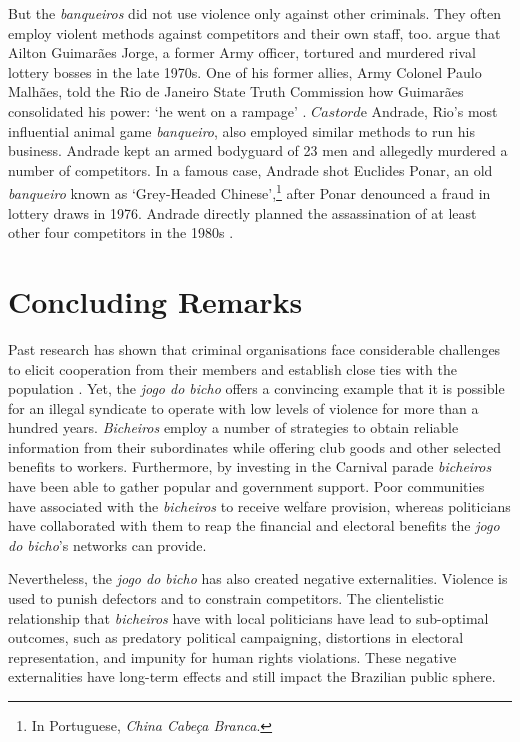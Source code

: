 \documentclass[a4paper,12pt]{article}
\begin{document}
But the \textit{banqueiros} did not use violence only against other criminals. They often employ violent methods against competitors and their own staff, too. \citet{jupiara2015poroes} argue that Ailton Guimarães Jorge, a former Army officer, tortured and murdered rival lottery bosses in the late 1970s. One of his former allies, Army Colonel Paulo Malhães, told the Rio de Janeiro State Truth Commission how Guimarães consolidated his power: `he went on a rampage' \citep{belem2015guimaraes}. $Castor d$e Andrade, Rio's most influential animal game \textit{banqueiro}, also employed similar methods to run his business. Andrade kept an armed bodyguard of 23 men and allegedly murdered a number of competitors. In a famous case, Andrade shot Euclides Ponar, an old \textit{banqueiro} known as `Grey-Headed Chinese',\footnote{In Portuguese, \textit{China Cabe\c{c}a Branca}.} after Ponar denounced a fraud in lottery draws in 1976. Andrade directly planned the assassination of at least other four competitors in the 1980s \citep{globo2017castor}.  

\section{Concluding Remarks}
\label{sec:conclusion3}

Past research has shown that criminal organisations face considerable challenges to elicit cooperation from their members and establish close ties with the population \citep[e.g.][]{gambetta1996sicilian,skarbek2011governance,skarbek2012prison,varese2001russian,varese2011mafias}. Yet, the \textit{jogo do bicho} offers a convincing example that it is possible for an illegal syndicate to operate with low levels of violence for more than a hundred years. \textit{Bicheiros} employ a number of strategies to obtain reliable information from their subordinates while offering club goods and other selected benefits to workers. Furthermore, by investing in the Carnival parade \textit{bicheiros} have been able to gather popular and government support. Poor communities have associated with the \textit{bicheiros} to receive welfare provision, whereas politicians have collaborated with them to reap the financial and electoral benefits the \textit{jogo do bicho}'s networks can provide.

Nevertheless, the \textit{jogo do bicho} has also created negative externalities. Violence is used to punish defectors and to constrain competitors. The clientelistic relationship that \textit{bicheiros} have with local politicians have lead to sub-optimal outcomes, such as predatory political campaigning, distortions in electoral representation, and impunity for human rights violations. These negative externalities have long-term effects and still impact the Brazilian public sphere.
\end{document}
